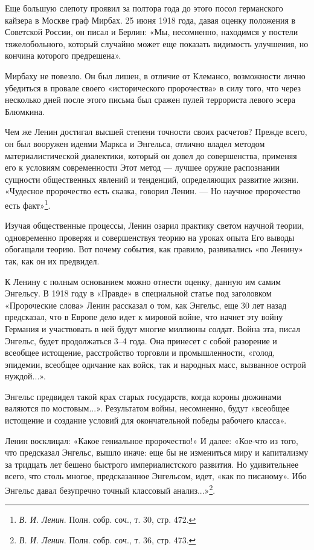 \documentclass[12pt, a4paper, openany]{book}
\begin{document}
Еще большую слепоту проявил за полтора года до этого посол германского кайзера в Москве граф Мирбах. 25 июня 1918 года, давая оценку положения в Советской России, он писал и Берлин: «Мы, несомненно, находимся у постели тяжелобольного, который случайно может еще показать видимость улучшения, но кончина которого предрешена».

Мирбаху не повезло. Он был лишен, в отличие от Клемансо, возможности лично убедиться в провале своего «исторического пророчества» в силу того, что через несколько дней после этого письма был сражен пулей террориста левого эсера Блюмкина.

Чем же Ленин достигал высшей степени точности своих расчетов? Прежде всего, он был вооружен идеями Маркса и Энгельса, отлично владел методом материалистической диалектики, который он довел до совершенства, применяя его к условиям современности Этот метод — лучшее оружие распознании сущности общественных явлений и тенденций, определяющих развитие жизни. «Чудесное пророчество есть сказка, говорил Ленин. — Но научное пророчество есть факт»\footnote{\textit{В. И. Ленин}. Полн. собр. соч., т. 30, стр. 472.}.

Изучая общественные процессы, Ленин озарил практику светом научной теории, одновременно проверяя и совершенствуя теорию на уроках опыта Его выводы обогащали теорию. Вот почему события, как правило, развивались «по Ленину» так, как он их предвидел.

К Ленину с полным основанием можно отнести оценку, данную им самим Энгельсу. В 1918 году в «Правде» в специальной статье под заголовком «Пророческие слова» Ленин рассказал о том, как Энгельс, еще 30 лет назад предсказал, что в Европе дело идет к мировой войне, что начнет эту войну Германия и участвовать в ней будут многие миллионы солдат. Война эта, писал Энгельс, будет продолжаться 3–4 года. Она принесет с собой разорение и всеобщее истощение, расстройство торговли и промышленности, «голод, эпидемии, всеобщее одичание как войск, так и народных масс, вызванное острой нуждой...».

Энгельс предвидел такой крах старых государств, когда короны дюжинами валяются по мостовым...». Результатом войны, несомненно, будут «всеобщее истощение и создание условий для окончательной победы рабочего класса».

Ленин восклицал: «Какое гениальное пророчество!» И далее: «Кое-что из того, что предсказал Энгельс, вышло иначе: еще бы не измениться миру и капитализму за тридцать лет бешено быстрого империалистского развития. Но удивительнее всего, что столь многое, предсказанное Энгельсом, идет, «как по писаному». Ибо Энгельс давал безупречно точный классовый анализ...»\footnote{\textit{В. И. Ленин}. Полн. собр. соч., т. 36, стр. 473.}.
\end{document}
